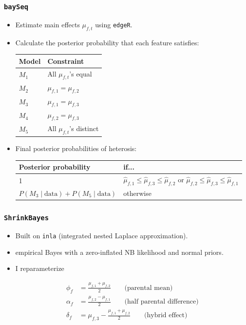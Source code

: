 \documentclass[handout]{beamer}
\providecommand{\wh}[1]{\widehat{#1}}
\numberwithin{equation}{section}
\begin{document}
\begin{frame}
\frametitle{{\tt baySeq}}
\begin{itemize}
\item Estimate main effects $\mu_{f, t}$ using {\tt edgeR}.
\pause \item Calculate the posterior probability that each feature satisfies:

\begin{center}
\begin{tabular}{l|l}
Model & Constraint \\ \hline
$M_1$ & All $\mu_{f, t}$'s equal \\
$M_2$ &  $\mu_{f, 1} = \mu_{f, 2}$ \\
$M_3$ & $\mu_{f, 1} = \mu_{f, 3}$ \\
$M_4$ & $\mu_{f, 2} = \mu_{f, 3}$ \\
$M_5$ &  All $\mu_{f, t}$'s distinct
\end{tabular}
\end{center}

\pause \item Final posterior probabilities of heterosis:
\begin{center}
\begin{tabular}{l|p{4cm}}
Posterior probability & if... \\ \hline
1 & $\wh{\mu}_{f, 1} \le \wh{\mu}_{f, 3} \le \wh{\mu}_{f, 2}$ or $\wh{\mu}_{f, 2} \le \wh{\mu}_{f, 3} \le \wh{\mu}_{f, 1}$ \\
$P(M_3 \mid \text{data}) + P(M_5 \mid \text{data})$ & otherwise
\end{tabular}
\end{center}

\end{itemize}
\end{frame}


\begin{frame}
\frametitle{{\tt ShrinkBayes}}
\begin{itemize}
\item Built on {\tt inla} (integrated nested Laplace approximation).
\pause \item empirical Bayes with a zero-inflated NB likelihood and normal priors.
\pause \item I reparameterize

\begin{align*}
\phi_f &= \frac{\mu_{f, 1} + \mu_{f, 2}}{2} \qquad \text{(parental mean)} \\
\alpha_f &= \frac{\mu_{f, 2} - \mu_{f, 1}}{2} \qquad \text{(half parental difference)} \\
\delta_f &= \mu_{f, 3} - \frac{\mu_{f, 1} + \mu_{f, 2}}{2} \qquad \text{(hybrid effect)} 
\end{align*}
\end{itemize}
\end{frame}
\end{document}
